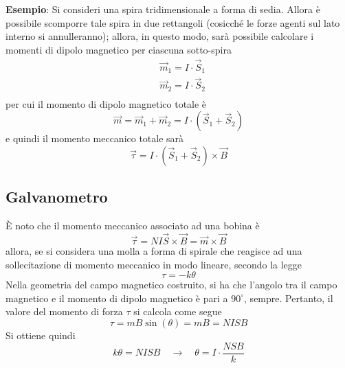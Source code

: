 \documentclass[a4paper]{extarticle}
\begin{document}
\vspace{1em}
\noindent
\textbf{Esempio}: Si consideri una spira tridimensionale a forma di sedia. Allora è possibile scomporre tale spira in due rettangoli (cosicché le forze agenti sul lato interno si annulleranno); allora, in questo modo, sarà possibile calcolare i momenti di dipolo magnetico per ciascuna sotto-spira
\begin{align*}
  &\vec{m}_1=I \cdot \vec{S}_1\\
  &\vec{m}_2=I \cdot \vec{S}_2\\
\end{align*}
per cui il momento di dipolo magnetico totale è
\[\vec m = \vec{m}_1 + \vec{m}_2 = I \cdot (\vec{S}_1 + \vec{S}_2)\]
e quindi il momento meccanico totale sarà
\[\vec \tau = I \cdot (\vec{S}_1 + \vec{S}_2) \times \vec B\]

\vspace{1em}
\subsection{Galvanometro}
È noto che il momento meccanico associato ad una bobina è
\[\vec \tau = N I \vec S \times \vec B = \vec m \times \vec B\]
allora, se si considera una molla a forma di spirale che reagisce ad una sollecitazione di momento meccanico in modo lineare, secondo la legge
\[\tau = - k \theta\]
Nella geometria del campo magnetico costruito, si ha che l'angolo tra il campo magnetico e il momento di dipolo magnetico è pari a $90^\circ$, sempre. Pertanto, il valore del momento di forza $\tau$ si calcola come segue
\[\tau = m B \sin(\theta) = m B =  NIS B\]
Si ottiene quindi
\[k \theta = NIS B \hspace{1em} \rightarrow \hspace{1em} \theta = I \cdot \dfrac{NSB}{k}\]
\end{document}
